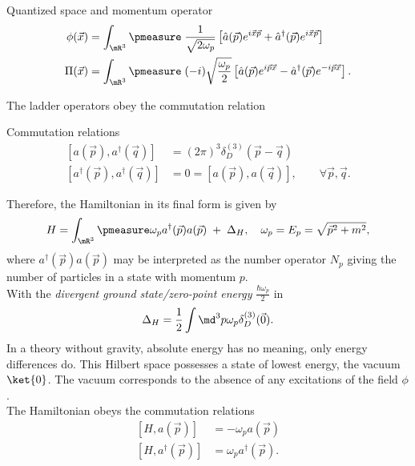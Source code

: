 \begin{mybox}{Quantized space and momentum operator}
	\begin{align}
		\phi(\vec{x})&= \int_{\mR^3} \pmeasure \; \frac{1}{\sqrt{2 \omega_p}} \left[\hat{a}(\vec{p}) e^{i \vec{x}\vec{p}} +\hat{a}^{\dagger}(\vec{p})e^{ i \vec{x}\vec{p}}  \right]\\
		\Pi(\vec{x}) &= \int_{\mR^3} \pmeasure \; (-i) \sqrt{\frac{\omega_p}{2}} \left[\hat{a}(\vec{p}) e^{i \vec{p}\vec{x}} - \hat{a}^{\dagger}(\vec{p}) e^{-i\vec{p}\vec{x}} \right].
	\end{align}
\end{mybox}
The ladder operators obey the commutation relation
\begin{mybox}{Commutation relations}
	\begin{align}
		\left[a(\vec{p}), a^{\dagger} (\vec{q})  \right] &= (2 \pi)^3 \delta^{(3)}_D(\vec{p}-\vec{q}) \\
		\left[a^{\dagger}(\vec{p}), a^{\dagger} (\vec{q}) \right] &=0= \left[a(\vec{p}), a(\vec{q})\right], \qquad \forall \vec{p},\vec{q}.
	\end{align}
\end{mybox}
Therefore, the Hamiltonian in its final form is given by
\begin{equation}
	H = \int_{\mR^3} \pmeasure \omega_p a^{\dagger}(\vec{p}) a(\vec{p}) \; + \; \Delta_H, \quad \omega_p = E_p =\sqrt{\vec{p}^2+m^2},
\end{equation}
where $a^{\dagger}(\vec{p}) a(\vec{p}) $ may be interpreted as the number operator $N_p$ giving the number of particles in a state with momentum $p$.\\
With the \emph{divergent ground state/zero-point energy} $\frac{\hbar \omega_p}{2}$ in
\begin{equation}
	\Delta_H = \frac{1}{2} \int \md^3 p \omega_p \delta^{(3)}_D(\vec{0}).
\end{equation}
In a theory without gravity, absolute energy has no meaning, only energy differences do. This Hilbert space possesses a state of lowest energy, the vacuum $\ket{0}$. The vacuum corresponds to the absence of any excitations of the field $\phi$.\\
The Hamiltonian obeys the commutation relations
\begin{align}
	\left[H,a(\vec{p})\right] &= - \omega_p a(\vec{p}) \\
	\left[H,a^{\dagger}(\vec{p})\right] &= \omega_p a^{\dagger}(\vec{p}).
\end{align}
